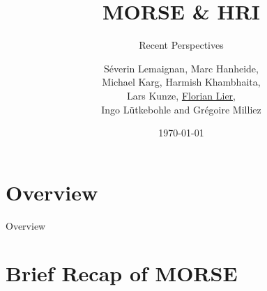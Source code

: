 \documentclass[compress]{beamer}
\title{MORSE \& HRI}
\subtitle{Recent Perspectives}
\date{\today}
\author{Séverin Lemaignan, Marc Hanheide, \\ Michael Karg, Harmish Khambhaita,
\\Lars Kunze, \underline{Florian Lier}, \\Ingo Lütkebohle and Grégoire Milliez}
\begin{document}

\maketitle


\section*{Overview}
\begin{frame}{Overview}
	\tableofcontents[hideallsubsections]
\end{frame}

\section{Brief Recap of MORSE}
\end{document}
